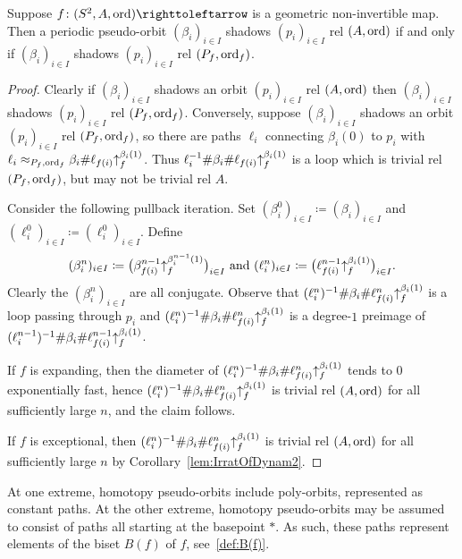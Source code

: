\documentclass{amsart}
\begin{document}
\begin{prop}\label{prop:ShadAndExtraPts}
  Suppose $f\colon(S^2,A,\ord)\selfmap$ is a geometric non-invertible
  map. Then a periodic pseudo-orbit $(\beta_i)_{i\in I}$ shadows
  $(p_i)_{i\in I}$ rel $(A,\operatorname{ord})$ if and only if $(\beta_i)_{i\in I}$
  shadows $(p_i)_{i\in I}$ rel $(P_f,\operatorname{ord}_f)$.
\end{prop}
\begin{proof}
  Clearly if $(\beta_i)_{i\in I}$ shadows an orbit $(p_i)_{i\in I}$
  rel $(A,\operatorname{ord})$ then $(\beta_i)_{i\in I}$ shadows $(p_i)_{i\in I}$
  rel $(P_f,\operatorname{ord}_f)$. Conversely, suppose $(\beta_i)_{i\in I}$ shadows
  an orbit $(p_i)_{i\in I}$ rel $(P_f,\operatorname{ord}_f)$, so there are paths
  $\ell_i$ connecting $\beta_i(0)$ to $p_i$ with
  $\ell_i\approx_{P_f,\operatorname{ord}_f} \beta_i\#
  \ell_{f(i)}{\uparrow}_{f}^{\beta_i(1)}$. Thus
  $\ell_i^{-1}\#\beta_i\#\ell_{f(i)}{\uparrow}_{f}^{\beta_i(1)}$ is a loop
  which is trivial rel $(P_f,\operatorname{ord}_f)$, but may not be trivial rel $A$.

  Consider the following pullback iteration. Set
  $(\beta^0_i)_{i\in I}\coloneqq(\beta_i)_{i\in I}$ and
  $(\ell^{0}_i)_{i\in I}\coloneqq(\ell^{0}_i)_{i\in I}$. Define
  \[(\beta^n_i)_{i\in I}\coloneqq\big(\beta^{n-1}_{f(i)}{\uparrow}_{f}^{\beta^{n-1}_i(1)}\big)_{i\in I}
    \text{ and }(\ell^{n}_i)_{i\in I}\coloneqq\big(\ell^{n-1}_{f(i)}{\uparrow}_{f}^{\beta_i(1)}\big)_{i\in I}.
  \]
  Clearly the $(\beta^n_i)_{i\in I}$ are all conjugate.  Observe that
  $(\ell_i^n)^{-1}\#\beta_i\#\ell^n_{f(i)}{\uparrow}_{f}^{\beta_i(1)}$ is a
  loop passing through $p_i$ and
  $(\ell_i^n)^{-1}\#\beta_i\#\ell^n_{f(i)}{\uparrow}_{f}^{\beta_i(1)}$ is a
  degree-$1$ preimage of
  $(\ell_i^{n-1})^{-1}\#\beta_i\#\ell^{n-1}_{f(i)}{\uparrow}_{f}^{\beta_i(1)}$.

  If $f$ is expanding, then the diameter of
  $(\ell_i^n)^{-1}\#\beta_i\#\ell^n_{f(i)}{\uparrow}_{f}^{\beta_i(1)}$
  tends to $0$ exponentially fast, hence
  $(\ell_i^n)^{-1}\#\beta_i\#\ell^n_{f(i)}{\uparrow}_{f}^{\beta_i(1)}$ is
  trivial rel $(A,\operatorname{ord})$ for all sufficiently large $n$, and the claim
  follows.

  If $f$ is exceptional, then
  $(\ell_i^n)^{-1}\#\beta_i\#\ell^n_{f(i)}{\uparrow}_{f}^{\beta_i(1)}$ is
  trivial rel $(A,\operatorname{ord})$ for all sufficiently large $n$ by
  Corollary~\ref{lem:IrratOfDynam2}.
\end{proof}

At one extreme, homotopy pseudo-orbits include poly-orbits,
represented as constant paths. At the other extreme, homotopy
pseudo-orbits may be assumed to consist of paths all starting at the
basepoint $*$. As such, these paths represent elements of the biset
$B(f)$ of $f$, see~\ref{def:B(f)}.
\end{document}

